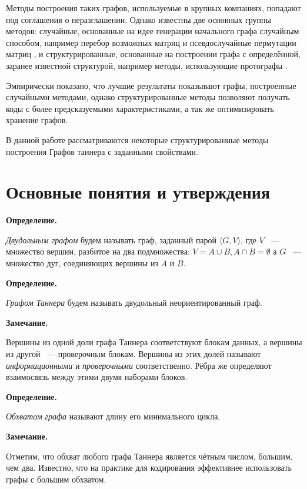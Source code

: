 \documentclass[14pt]{mmcs_article}
\begin{document}
Методы построения таких графов, используемые в крупных компаниях, попадают под соглашения о неразглашении. Однако известны две основных группы методов: случайные, основанные на идее генерации начального графа случайным способом, например перебор возможных матриц \cite{bruteforce} и псевдослучайные пермутации матриц \cite{gallager}, и структурированные, основанные на построении графа с определённой, заранее известной структурой, например методы, использующие протографы \cite{protographs}.

Эмпирически показано, что лучшие результаты показывают графы, построенные случайными методами, однако структурированные методы позволяют получать коды с более предсказуемыми характеристиками, а так же оптимизировать хранение графов. 

В данной работе рассматриваются некоторые структурированные методы построения Графов таннера с заданными свойствами.

\newpage
\section{Основные понятия и утверждения}\label{dsfs}

\textbf{Определение.}

\textsl{Двудольным графом} будем называть граф, заданный парой $\langle G, V \rangle$, где $V$ ~--- множество вершин, разбитое на два подмножества: $V = A \cup B, A \cap B = \emptyset$ а $G$ ~--- множество дуг, соединяющих вершины из $A$ и $B$.

\textbf{Определение.}

\textsl{Графом Таннера} будем называть двудольный неориентированный граф.

\textbf{Замечание.}

Вершины из одной доли графа Таннера соответствуют блокам данных, а вершины из другой ~--- проверочным блокам. Вершины из этих долей называют \textsl{информационными} и \textsl{проверочными} соответственно. Рёбра же определяют взаимосвязь между этими двумя наборами блоков.

\textbf{Определение.}

\textsl{Обхватом графа} называют длину его минимального цикла.

\textbf{Замечание.}

Отметим, что обхват любого графа Таннера является чётным числом, большим, чем два. Известно, что на практике для кодирования эффективнее использовать графы с большим обхватом.
\end{document}
